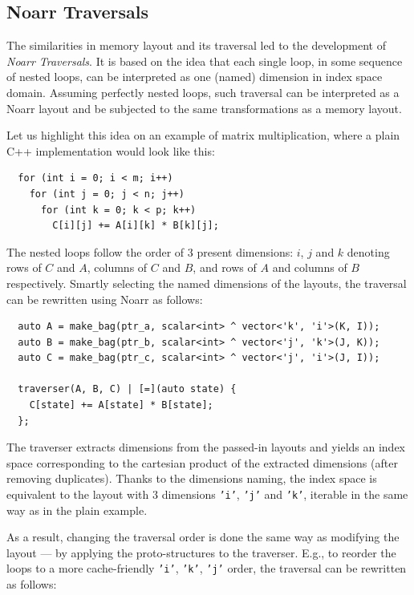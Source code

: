\subsection{Noarr Traversals}

The similarities in memory layout and its traversal led to the development of \emph{Noarr Traversals}. It is based on the idea that each single loop, in some sequence of nested loops, can be interpreted as one (named) dimension in index space domain. Assuming perfectly nested loops, such traversal can be interpreted as a Noarr layout and be subjected to the same transformations as a memory layout.

Let us highlight this idea on an example of matrix multiplication, where a plain C++ implementation would look like this:

\begin{verbatim}
  for (int i = 0; i < m; i++) 
    for (int j = 0; j < n; j++) 
      for (int k = 0; k < p; k++) 
        C[i][j] += A[i][k] * B[k][j];
\end{verbatim}
The nested loops follow the order of $3$ present dimensions: $i$, $j$ and $k$ denoting rows of $C$ and $A$, columns of $C$ and $B$, and rows of $A$ and columns of $B$ respectively. Smartly selecting the named dimensions of the layouts, the traversal can be rewritten using Noarr as follows:

\begin{verbatim}
  auto A = make_bag(ptr_a, scalar<int> ^ vector<'k', 'i'>(K, I));
  auto B = make_bag(ptr_b, scalar<int> ^ vector<'j', 'k'>(J, K));
  auto C = make_bag(ptr_c, scalar<int> ^ vector<'j', 'i'>(J, I));
  
  traverser(A, B, C) | [=](auto state) {
    C[state] += A[state] * B[state];
  };
\end{verbatim}

The traverser extracts dimensions from the passed-in layouts and yields an index space corresponding to the cartesian product of the extracted dimensions (after removing duplicates). Thanks to the dimensions naming, the index space is equivalent to the layout with $3$ dimensions \texttt{'i'}, \texttt{'j'} and \texttt{'k'}, iterable in the same way as in the plain example.

As a result, changing the traversal order is done the same way as modifying the layout --- by applying the proto-structures to the traverser. E.g., to reorder the loops to a more cache-friendly \texttt{'i'}, \texttt{'k'}, \texttt{'j'} order, the traversal can be rewritten as follows:

